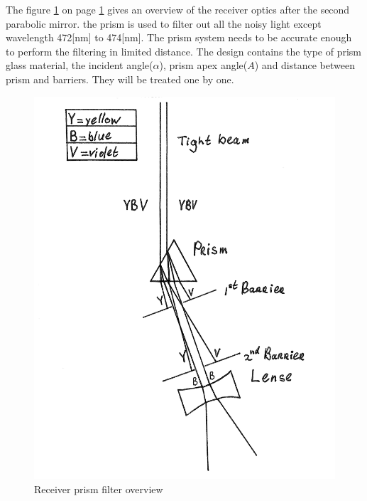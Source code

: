 The figure \ref{fig:prism} on page \ref{fig:prism} gives an overview of the receiver optics after the second parabolic mirror. the prism is used to filter out all the noisy light except wavelength 472[nm] to 474[nm]. The prism system needs to be accurate enough to perform the filtering in limited distance. The design contains the type of prism glass material, the incident angle($\alpha$), prism apex angle($A$) and distance between prism and barriers. They will be treated one by one.

\begin{figure}[ht!]
\centering
\includegraphics[scale = 0.8]{chapters/img/Prism.png}
\caption{Receiver prism filter overview}
\label{fig:prism}
\end{figure} 


